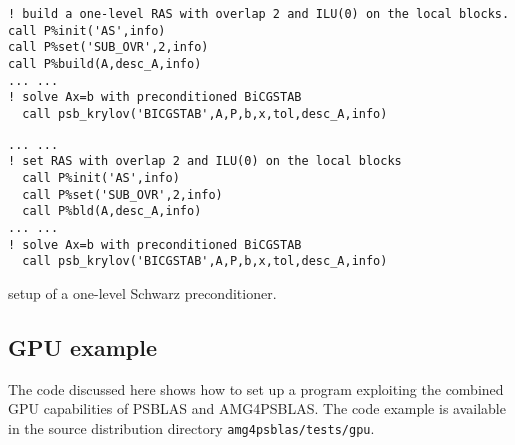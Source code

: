 \begin{listing}[h!]
\ifpdf
\begin{verbatim}
! build a one-level RAS with overlap 2 and ILU(0) on the local blocks.
call P%init('AS',info)
call P%set('SUB_OVR',2,info)
call P%build(A,desc_A,info)
... ...
! solve Ax=b with preconditioned BiCGSTAB
  call psb_krylov('BICGSTAB',A,P,b,x,tol,desc_A,info)
\end{verbatim}
\else
\begin{center}
\begin{minipage}{.90\textwidth}
{\small
\begin{verbatim}
... ...
! set RAS with overlap 2 and ILU(0) on the local blocks
  call P%init('AS',info)
  call P%set('SUB_OVR',2,info)
  call P%bld(A,desc_A,info)
... ...
! solve Ax=b with preconditioned BiCGSTAB
  call psb_krylov('BICGSTAB',A,P,b,x,tol,desc_A,info)
\end{verbatim}
}
\end{minipage}
\end{center}
\fi\vspace{-2em}%
\caption{setup of a one-level Schwarz preconditioner.\label{fig:ex4}}
\end{listing}



\subsection{GPU example\label{sec:gpu-example}}

The code discussed here  shows how to set  up a
program exploiting the combined GPU capabilities of PSBLAS and
AMG4PSBLAS. The code example is available in the source distribution
directory \verb|amg4psblas/tests/gpu|. 

